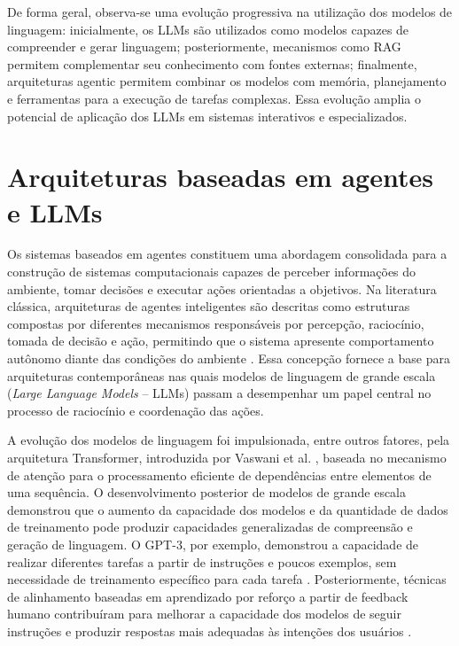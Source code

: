 De forma geral, observa-se uma evolução progressiva na utilização dos modelos de linguagem: inicialmente, os LLMs são utilizados como modelos capazes de compreender e gerar linguagem; posteriormente, mecanismos como RAG permitem complementar seu conhecimento com fontes externas; finalmente, arquiteturas agentic permitem combinar os modelos com memória, planejamento e ferramentas para a execução de tarefas complexas. Essa evolução amplia o potencial de aplicação dos LLMs em sistemas interativos e especializados.

\section{Arquiteturas baseadas em agentes e LLMs}

Os sistemas baseados em agentes constituem uma abordagem consolidada para a construção de sistemas computacionais capazes de perceber informações do ambiente, tomar decisões e executar ações orientadas a objetivos. Na literatura clássica, arquiteturas de agentes inteligentes são descritas como estruturas compostas por diferentes mecanismos responsáveis por percepção, raciocínio, tomada de decisão e ação, permitindo que o sistema apresente comportamento autônomo diante das condições do ambiente \cite{muller1999}. Essa concepção fornece a base para arquiteturas contemporâneas nas quais modelos de linguagem de grande escala (\textit{Large Language Models} -- LLMs) passam a desempenhar um papel central no processo de raciocínio e coordenação das ações.

A evolução dos modelos de linguagem foi impulsionada, entre outros fatores, pela arquitetura Transformer, introduzida por Vaswani et al. \cite{vaswani2017attention}, baseada no mecanismo de atenção para o processamento eficiente de dependências entre elementos de uma sequência. O desenvolvimento posterior de modelos de grande escala demonstrou que o aumento da capacidade dos modelos e da quantidade de dados de treinamento pode produzir capacidades generalizadas de compreensão e geração de linguagem. O GPT-3, por exemplo, demonstrou a capacidade de realizar diferentes tarefas a partir de instruções e poucos exemplos, sem necessidade de treinamento específico para cada tarefa \cite{brown2020language}. Posteriormente, técnicas de alinhamento baseadas em aprendizado por reforço a partir de feedback humano contribuíram para melhorar a capacidade dos modelos de seguir instruções e produzir respostas mais adequadas às intenções dos usuários \cite{ouyang2022training}.

